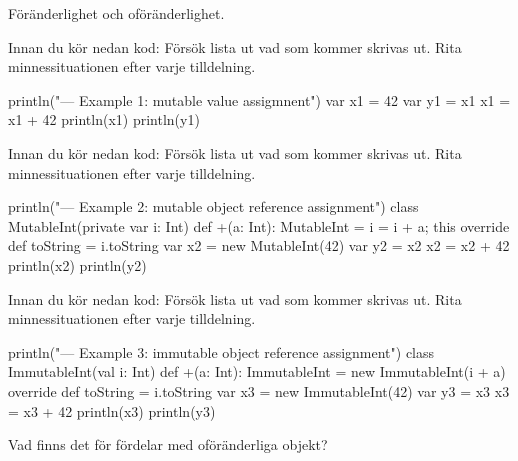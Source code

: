 

\Exercise{\ExeWeekFOUR}

\begin{Goals}
\item 
\end{Goals}

\begin{Preparations}
\item 
\end{Preparations}

\BasicTasks %

\Task Föränderlighet och oföränderlighet.

\Subtask Innan du kör nedan kod: Försök lista ut vad som kommer skrivas ut. Rita minnessituationen efter varje tilldelning.

\begin{Code}
println("\n--- Example 1: mutable value assigmnent")
var x1 = 42
var y1 = x1
x1 = x1 + 42
println(x1)
println(y1)
\end{Code}

\Subtask Innan du kör nedan kod: Försök lista ut vad som kommer skrivas ut. Rita minnessituationen efter varje tilldelning.

\begin{Code}
println("\n--- Example 2: mutable object reference assignment")
class MutableInt(private var i: Int) {
  def +(a: Int): MutableInt = { i = i + a; this }
  override def toString = i.toString
}
var x2 = new MutableInt(42)
var y2 = x2
x2 = x2 + 42
println(x2)
println(y2)
\end{Code}

\Subtask Innan du kör nedan kod: Försök lista ut vad som kommer skrivas ut. Rita minnessituationen efter varje tilldelning.

\begin{Code}
println("\n--- Example 3: immutable object reference assignment")
class ImmutableInt(val i: Int) {
  def +(a: Int): ImmutableInt = new ImmutableInt(i + a) 
  override def toString = i.toString
}
var x3 = new ImmutableInt(42)
var y3 = x3
x3 = x3 + 42
println(x3)
println(y3)
\end{Code}

\Subtask\Pen Vad finns det för fördelar med oföränderliga objekt?

\ExtraTasks %

\Task 

\AdvancedTasks %

\Task     
    